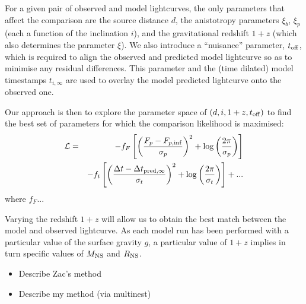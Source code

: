 \documentclass{aastex63}
\begin{document}
For a given pair of observed and model lightcurves, the only parameters that affect the comparison are the source distance $d$, the anistotropy parameters $\xi_b$, $\xi_p$ (each a function of the inclination $i$), and the gravitational redshift $1+z$ (which also determines the parameter $\xi$).
%
We also introduce a ``nuisance'' parameter, $t_{\rm off}$, which is required to align the observed and predicted model lightcurve so as to minimise any residual differences. This parameter and the (time dilated) model timestamps $t_{i,\infty}$ are used to overlay the model predicted lightcurve onto the observed one.

Our approach is then to explore the parameter space of $(d, i, 1+z, t_{\rm off})$ to find the best set of parameters for which the comparison likelihood is maximised:
\begin{eqnarray}
\mathcal{L} & = & -f_F\left[\left( \frac{F_p-F_{p,\rm{inf}}}{\sigma_{p}}\right)^2 
    + \log\left(\frac{2\pi}{\sigma_p}\right)\right] \\
 & & -f_t\left[ \left( \frac{\Delta t-\Delta t_{{\rm pred},\infty}}{\sigma_t}\right)^2
    + \log\left(\frac{2\pi}{\sigma_t}\right)\right] + ...\\
\end{eqnarray}
where $f_F$...

Varying the redshift $1+z$ will allow us to obtain the best match between the model and observed lightcurve.
As each model run has been performed with a particular value of the surface gravity $g$, a particular value of $1+z$ implies in turn specific values of $M_{\rm NS}$ and $R_{\rm NS}$. 

\begin{itemize}
\item Describe Zac's method
\item Describe my method (via multinest)
\end{itemize}
\end{document}
